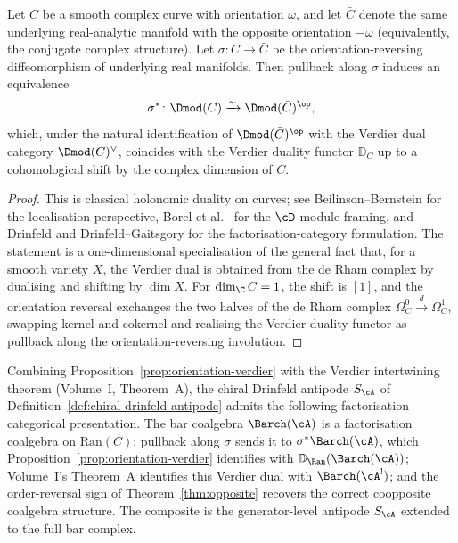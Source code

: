 \begin{proposition}
\label{prop:orientation-verdier}
Let $C$ be a smooth complex curve with orientation $\omega$, and let
$\bar{C}$ denote the same underlying real-analytic manifold with
the opposite orientation $-\omega$ (equivalently, the conjugate
complex structure). Let $\sigma \colon C \to \bar{C}$ be the
orientation-reversing diffeomorphism of underlying real manifolds.
Then pullback along $\sigma$ induces an equivalence
\[
\sigma^{*} \colon \Dmod(C) \xrightarrow{\sim} \Dmod(\bar{C})^{\op},
\]
which, under the natural identification of $\Dmod(\bar{C})^{\op}$
with the Verdier dual category $\Dmod(C)^{\vee}$, coincides with the
Verdier duality functor $\mathbb{D}_C$ up to a cohomological shift
by the complex dimension of $C$.
\end{proposition}

\begin{proof}
This is classical holonomic duality on curves; see
Beilinson--Bernstein \cite{BeilinsonBernstein} for the localisation
perspective, Borel et al.\ \cite{BorelDmodules} for the
$\cD$-module framing, and Drinfeld \cite{Drinfeld90} and
Drinfeld--Gaitsgory for the factorisation-category
formulation. The statement is a one-dimensional specialisation of
the general fact that, for a smooth variety $X$, the Verdier dual is
obtained from the de Rham complex by dualising and shifting by
$\dim X$. For $\dim_\C C = 1$, the shift is $[1]$, and the
orientation reversal exchanges the two halves of the de Rham
complex $\Omega^0_C \xrightarrow{d} \Omega^1_C$, swapping kernel
and cokernel and realising the Verdier duality functor as pullback
along the orientation-reversing involution.
\end{proof}

\begin{remark}
\label{rem:orientation-verdier-consequence}
Combining Proposition~\ref{prop:orientation-verdier} with the
Verdier intertwining theorem (Volume~I, Theorem~A), the chiral
Drinfeld antipode $S_\cA$ of
Definition~\ref{def:chiral-drinfeld-antipode} admits the following
factorisation-categorical presentation. The bar coalgebra
$\Barch(\cA)$ is a factorisation coalgebra on
$\mathrm{Ran}(C)$; pullback along $\sigma$ sends it to
$\sigma^* \Barch(\cA)$, which Proposition~\ref{prop:orientation-verdier}
identifies with $\mathbb{D}_{\Ran}(\Barch(\cA))$; Volume~I's
Theorem~A identifies this Verdier dual with $\Barch(\cA^!)$; and
the order-reversal sign of Theorem~\ref{thm:opposite} recovers the
correct coopposite coalgebra structure. The composite is the
generator-level antipode $S_\cA$ extended to the full bar complex.
\end{remark}

